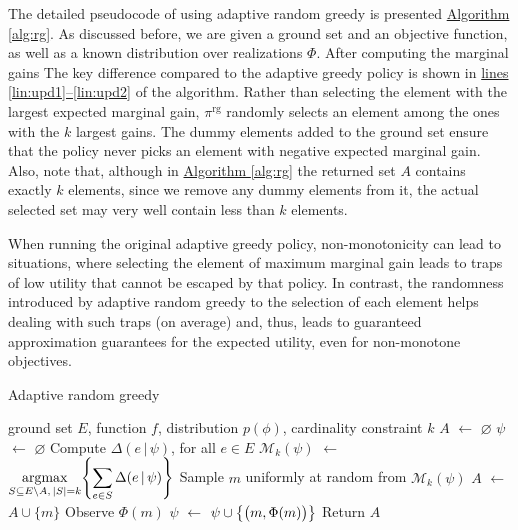 \documentclass{article}
\newcommand{\algoref}[1]{\hyperref[#1]{Algorithm \ref*{#1}}}
\newcommand{\linesref}[2]{\hyperref[#1]{lines \ref*{#1}--\ref*{#2}}}
\newcommand*\LET[2]{\STATE #1 $\gets$ #2}
\newcommand{\argmax}{\operatornamewithlimits{argmax}}
\let\originalleft\left
\let\originalright\right
\renewcommand{\left}{\mathopen{}\mathclose\bgroup\originalleft}
\renewcommand{\right}{\aftergroup\egroup\originalright}
\newcommand{\mmid}{\,\vert\,}
\newcommand{\D}[2]{\Delta(#1\mmid#2)}
\newcommand{\pig}{\pi^{\textrm{rg}}}
\newcommand{\Mk}{\mathcal{M}_k}
\begin{document}
The detailed pseudocode of using adaptive random greedy is presented \algoref{alg:rg}.
As discussed before, we are given a ground set and an objective function, as well as a known distribution over realizations $\Phi$.
After computing the marginal gains
The key difference compared to the adaptive greedy policy is shown in \linesref{lin:upd1}{lin:upd2} of the algorithm.
Rather than selecting the element with the largest expected marginal gain, $\pig$ randomly selects an element among the ones with the $k$ largest gains.
The dummy elements added to the ground set ensure that the policy never picks an element with negative expected marginal gain.
Also, note that, although in \algoref{alg:rg} the returned set $A$ contains exactly $k$ elements, since we remove any dummy elements from it, the actual selected set may very well contain less than $k$ elements.

When running the original adaptive greedy policy, non-monotonicity can lead to situations, where selecting the element of maximum marginal gain leads to traps of low utility that cannot be escaped by that policy.
In contrast, the randomness introduced by adaptive random greedy to the selection of each element helps dealing with such traps (on average) and, thus, leads to guaranteed approximation guarantees for the expected utility, even for non-monotone objectives.

\begin{algorithm}[tb]
  \caption{Adaptive random greedy}
  \label{alg:rg}
  \normalsize{
    \begin{algorithmic}[1]
      \REQUIRE ground set $E$, function $f$, distribution $p(\phi)$, cardinality constraint $k$
      \LET{$A$}{$\varnothing$}
      \LET{$\psi$}{$\varnothing$}
      \STATE Compute $\D{e}{\psi}$, for all $e \in E$ \label{lin:marg}
      \LET{$\Mk(\psi)$}{$\displaystyle\argmax_{S \subseteq E \setminus A,\,|S| = k}\left\{\sum_{e \in S} \D{e}{\psi} \right\}$} \label{lin:upd1}
      \STATE Sample $m$ uniformly at random from $\Mk(\psi)$ \label{lin:upd2}
      \LET{$A$}{$A \cup \{m\}$}
      \STATE Observe $\Phi(m)$
      \LET{$\psi$}{$\psi \cup \left\{\big(m, \Phi(m)\big)\right\}$}
      \ENDFOR
      \STATE Return $A$
    \end{algorithmic}
  }
\end{algorithm}
\end{document}
